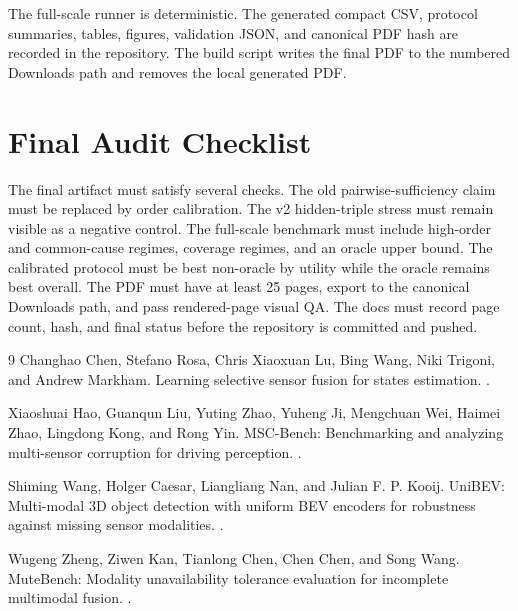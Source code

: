 \documentclass{article}
\begin{document}
The full-scale runner is deterministic. The generated compact CSV, protocol summaries, tables, figures, validation JSON, and canonical PDF hash are recorded in the repository. The build script writes the final PDF to the numbered Downloads path and removes the local generated PDF.

\section{Final Audit Checklist}

The final artifact must satisfy several checks. The old pairwise-sufficiency claim must be replaced by order calibration. The v2 hidden-triple stress must remain visible as a negative control. The full-scale benchmark must include high-order and common-cause regimes, coverage regimes, and an oracle upper bound. The calibrated protocol must be best non-oracle by utility while the oracle remains best overall. The PDF must have at least 25 pages, export to the canonical Downloads path, and pass rendered-page visual QA. The docs must record page count, hash, and final status before the repository is committed and pushed.

\begin{thebibliography}{9}
Changhao Chen, Stefano Rosa, Chris Xiaoxuan Lu, Bing Wang, Niki Trigoni, and Andrew Markham.
\newblock Learning selective sensor fusion for states estimation.
.

Xiaoshuai Hao, Guanqun Liu, Yuting Zhao, Yuheng Ji, Mengchuan Wei, Haimei Zhao, Lingdong Kong, and Rong Yin.
\newblock MSC-Bench: Benchmarking and analyzing multi-sensor corruption for driving perception.
.

Shiming Wang, Holger Caesar, Liangliang Nan, and Julian F. P. Kooij.
\newblock UniBEV: Multi-modal 3D object detection with uniform BEV encoders for robustness against missing sensor modalities.
.

Wugeng Zheng, Ziwen Kan, Tianlong Chen, Chen Chen, and Song Wang.
\newblock MuteBench: Modality unavailability tolerance evaluation for incomplete multimodal fusion.
.
\end{thebibliography}
\end{document}
